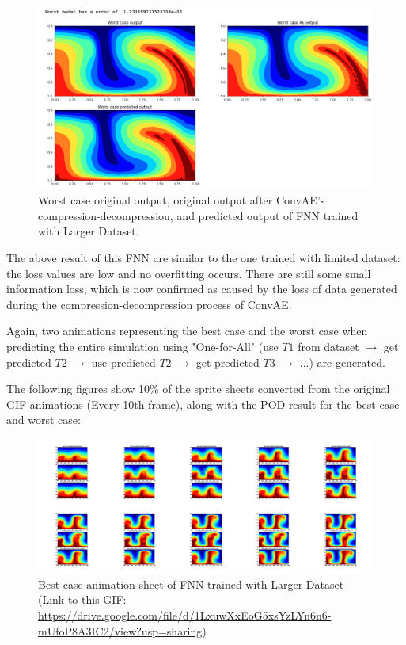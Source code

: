 \begin{figure}[H]
    \caption{Worst case original output, original output after ConvAE's compression-decompression, and predicted output of FNN trained with Larger Dataset.}
    \includegraphics[scale=0.5]{figures/mantle_convection_images/larger_dataset/FNN_Worst.png}
\end{figure}

The above result of this FNN are similar to the one trained with limited dataset: the loss values are low and no overfitting occurs. There are still some small information loss, which is now confirmed as caused by the loss of data generated during the compression-decompression process of ConvAE.

Again, two animations representing the best case and the worst case when predicting the entire simulation using "One-for-All" (use $T1$ from dataset $\rightarrow$ get predicted $T2$ $\rightarrow$ use predicted $T2$ $\rightarrow$ get predicted $T3$ $\rightarrow$ ...) are generated.

The following figures show 10\% of the sprite sheets converted from the original GIF animations (Every 10th frame), along with the POD result for the best case and worst case:

\begin{figure}[H]
    \centering
    \caption{Best case animation sheet of FNN trained with Larger Dataset (Link to this GIF: \url{https://drive.google.com/file/d/1LxuwXxEoG5xsYzLYn6n6-mUfoP8A3IC2/view?usp=sharing})}
    \includegraphics[scale=0.10]{figures/mantle_convection_images/larger_dataset/FNN_Best_GIF_sheet.png}
\end{figure}

